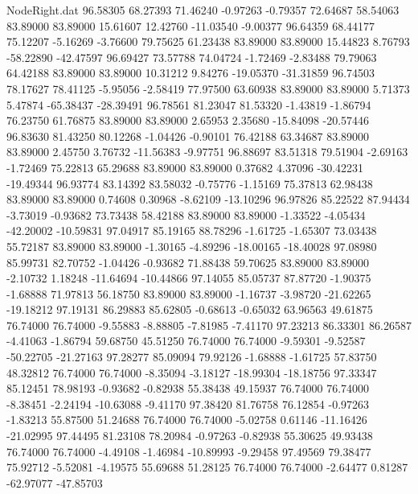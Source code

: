 \begin{filecontents}{NodeRight.dat}
  96.58305   68.27393   71.46240    -0.97263   -0.79357   72.64687   58.54063   83.89000   83.89000   15.61607   12.42760  -11.03540   -9.00377
  96.64359   68.44177   75.12207    -5.16269   -3.76600   79.75625   61.23438   83.89000   83.89000   15.44823    8.76793  -58.22890  -42.47597
  96.69427   73.57788   74.04724    -1.72469   -2.83488   79.79063   64.42188   83.89000   83.89000   10.31212    9.84276  -19.05370  -31.31859
  96.74503   78.17627   78.41125    -5.95056   -2.58419   77.97500   63.60938   83.89000   83.89000    5.71373    5.47874  -65.38437  -28.39491
  96.78561   81.23047   81.53320    -1.43819   -1.86794   76.23750   61.76875   83.89000   83.89000    2.65953    2.35680  -15.84098  -20.57446
  96.83630   81.43250   80.12268    -1.04426   -0.90101   76.42188   63.34687   83.89000   83.89000    2.45750    3.76732  -11.56383   -9.97751
  96.88697   83.51318   79.51904    -2.69163   -1.72469   75.22813   65.29688   83.89000   83.89000    0.37682    4.37096  -30.42231  -19.49344
  96.93774   83.14392   83.58032    -0.75776   -1.15169   75.37813   62.98438   83.89000   83.89000    0.74608    0.30968   -8.62109  -13.10296
  96.97826   85.22522   87.94434    -3.73019   -0.93682   73.73438   58.42188   83.89000   83.89000   -1.33522   -4.05434  -42.20002  -10.59831
  97.04917   85.19165   88.78296    -1.61725   -1.65307   73.03438   55.72187   83.89000   83.89000   -1.30165   -4.89296  -18.00165  -18.40028
  97.08980   85.99731   82.70752    -1.04426   -0.93682   71.88438   59.70625   83.89000   83.89000   -2.10732    1.18248  -11.64694  -10.44866
  97.14055   85.05737   87.87720    -1.90375   -1.68888   71.97813   56.18750   83.89000   83.89000   -1.16737   -3.98720  -21.62265  -19.18212
  97.19131   86.29883   85.62805    -0.68613   -0.65032   63.96563   49.61875   76.74000   76.74000   -9.55883   -8.88805   -7.81985   -7.41170
  97.23213   86.33301   86.26587    -4.41063   -1.86794   59.68750   45.51250   76.74000   76.74000   -9.59301   -9.52587  -50.22705  -21.27163
  97.28277   85.09094   79.92126    -1.68888   -1.61725   57.83750   48.32812   76.74000   76.74000   -8.35094   -3.18127  -18.99304  -18.18756
  97.33347   85.12451   78.98193    -0.93682   -0.82938   55.38438   49.15937   76.74000   76.74000   -8.38451   -2.24194  -10.63088   -9.41170
  97.38420   81.76758   76.12854    -0.97263   -1.83213   55.87500   51.24688   76.74000   76.74000   -5.02758    0.61146  -11.16426  -21.02995
  97.44495   81.23108   78.20984    -0.97263   -0.82938   55.30625   49.93438   76.74000   76.74000   -4.49108   -1.46984  -10.89993   -9.29458
  97.49569   79.38477   75.92712    -5.52081   -4.19575   55.69688   51.28125   76.74000   76.74000   -2.64477    0.81287  -62.97077  -47.85703

\end{filecontents}
